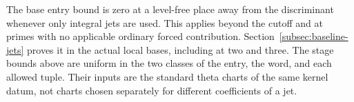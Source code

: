 The base entry bound is zero at a level-free place away
from the discriminant whenever only integral jets are
used. This applies beyond the cutoff and at primes
with no applicable ordinary forced contribution. Section~\ref{subsec:baseline-jets} proves it in the actual
local bases, including at two and three. The stage bounds above are
uniform in the two classes of the entry, the word, and
each allowed tuple. Their inputs are the standard
theta charts of the same kernel datum, not charts
chosen separately for different coefficients of a jet.
\label{cor:unserved-period-2}
